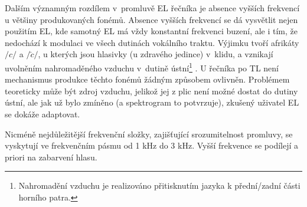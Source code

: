 Dalším významným rozdílem v~promluvě EL řečníka je absence vyšších frekvencí u většiny produkovaných fonémů.
Absence vyšších frekvencí se dá vysvětlit nejen použitím EL, kde samotný EL má vždy konstantní frekvenci buzení, ale i tím, že nedochází k modulaci ve všech dutinách vokálního traktu.
Výjimku tvoří afrikáty $/c/$ a $/\check{c}/$, u kterých jsou hlasivky (u zdravého jedince) v~klidu, a vznikají uvolněním nahromaděného vzduchu v~dutině ústní\footnote{Nahromadění vzduchu je realizováno přitisknutím jazyka k přední/zadní části horního patra.} \cite{Psutka2006}.
U řečníka po TL není mechanismus produkce těchto fonémů žádným způsobem ovlivněn.
Problémem teoreticky může být zdroj vzduchu, jelikož jej z plic není možné dostat do dutiny ústní, ale jak už bylo zmíněno (a spektrogram to potvrzuje), zkušený uživatel EL se dokáže adaptovat.

 Nicméně nejdůležitější frekvenční složky, zajišťující srozumitelnost promluvy, se vyskytují ve frekvenčním pásmu od 1 kHz do 3 kHz.
 Vyšší frekvence se podílejí a priori na zabarvení hlasu.

